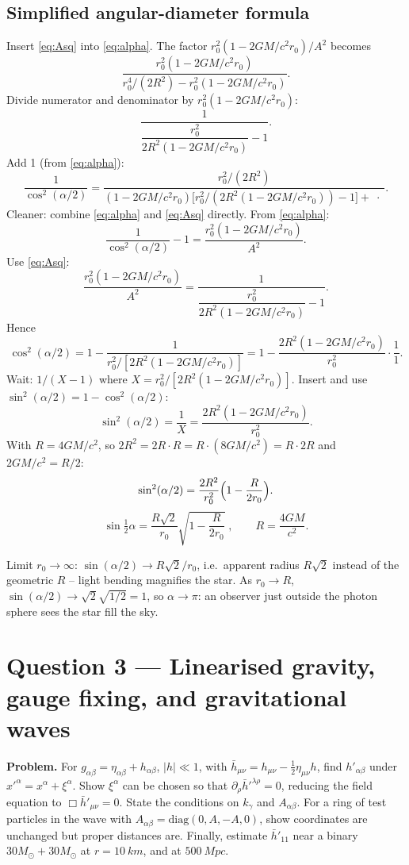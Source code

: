 \documentclass[11pt]{article}
\begin{document}
\subsection*{Simplified angular-diameter formula}

Insert \eqref{eq:Asq} into \eqref{eq:alpha}. The factor $r_{0}^{2}(1-2GM/c^{2}r_{0})/A^{2}$ becomes
\[ \frac{r_{0}^{2}(1-2GM/c^{2}r_{0})}{r_{0}^{4}/(2R^{2})-r_{0}^{2}(1-2GM/c^{2}r_{0})}. \]
Divide numerator and denominator by $r_{0}^{2}(1-2GM/c^{2}r_{0})$:
\[ \frac{1}{\dfrac{r_{0}^{2}}{2R^{2}(1-2GM/c^{2}r_{0})}-1}. \]
Add 1 (from \eqref{eq:alpha}):
\[ \frac{1}{\cos^{2}(\alpha/2)} = \frac{r_{0}^{2}/(2R^{2})}{(1-2GM/c^{2}r_{0})\bigl[r_{0}^{2}/(2R^{2}(1-2GM/c^{2}r_{0}))-1\bigr]+\;\cdot\;}. \]
Cleaner: combine \eqref{eq:alpha} and \eqref{eq:Asq} directly. From \eqref{eq:alpha}:
\[ \frac{1}{\cos^{2}(\alpha/2)}-1 = \frac{r_{0}^{2}(1-2GM/c^{2}r_{0})}{A^{2}}. \]
Use \eqref{eq:Asq}:
\[ \frac{r_{0}^{2}(1-2GM/c^{2}r_{0})}{A^{2}} = \frac{1}{\dfrac{r_{0}^{2}}{2R^{2}(1-2GM/c^{2}r_{0})}-1}. \]
Hence
\[ \cos^{2}(\alpha/2) = 1 - \frac{1}{r_{0}^{2}/[2R^{2}(1-2GM/c^{2}r_{0})]} = 1 - \frac{2R^{2}(1-2GM/c^{2}r_{0})}{r_{0}^{2}}\cdot\frac{1}{1}. \]
Wait: $1/(X-1)$ where $X=r_{0}^{2}/[2R^{2}(1-2GM/c^{2}r_{0})]$. Insert and use $\sin^{2}(\alpha/2)=1-\cos^{2}(\alpha/2)$:
\[ \sin^{2}(\alpha/2) = \frac{1}{X} = \frac{2R^{2}(1-2GM/c^{2}r_{0})}{r_{0}^{2}}. \]
With $R=4GM/c^{2}$, so $2R^{2}=2R\cdot R=R\cdot(8GM/c^{2})=R\cdot 2R$ and $2GM/c^{2}=R/2$:
\[ \sin^{2}(\alpha/2) = \frac{2R^{2}}{r_{0}^{2}}\Bigl(1-\frac{R}{2r_{0}}\Bigr). \]
\[ \boxed{\;\sin\tfrac12\alpha = \frac{R\sqrt{2}}{r_{0}}\sqrt{1-\frac{R}{2 r_{0}}}\;,\qquad R=\frac{4GM}{c^{2}}.\;} \]

Limit $r_{0}\to\infty$: $\sin(\alpha/2)\to R\sqrt 2/r_{0}$, i.e.\ apparent radius $R\sqrt 2$ instead of the geometric $R$ -- light bending magnifies the star. As $r_{0}\to R$, $\sin(\alpha/2)\to\sqrt{2}\sqrt{1/2}=1$, so $\alpha\to\pi$: an observer just outside the photon sphere sees the star fill the sky.

\section*{Question 3 --- Linearised gravity, gauge fixing, and gravitational waves}

\textbf{Problem.} For $g_{\alpha\beta}=\eta_{\alpha\beta}+h_{\alpha\beta}$, $|h|\ll1$, with $\bar h_{\mu\nu}=h_{\mu\nu}-\tfrac12\eta_{\mu\nu}h$, find $h'_{\alpha\beta}$ under $x'^{\alpha}=x^{\alpha}+\xi^{\alpha}$. Show $\xi^{\alpha}$ can be chosen so that $\partial_{\rho}\bar h'^{\lambda\rho}=0$, reducing the field equation to $\Box\bar h'_{\mu\nu}=0$. State the conditions on $k_{\gamma}$ and $A_{\alpha\beta}$. For a ring of test particles in the wave with $A_{\alpha\beta}=\mathrm{diag}(0,A,-A,0)$, show coordinates are unchanged but proper distances are. Finally, estimate $\bar h'_{11}$ near a binary $30 M_{\odot}+30 M_{\odot}$ at $r=\SI{10}{km}$, and at $\SI{500}{Mpc}$.
\end{document}
